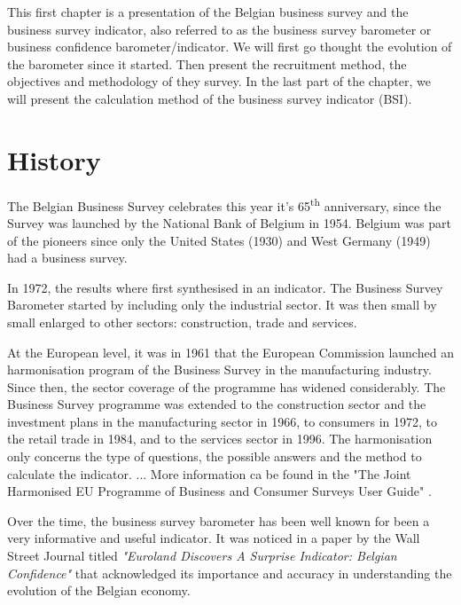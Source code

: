 \documentclass[12pt,a4paper,oneside]{book}
\begin{document}
This first chapter is a presentation of the Belgian business survey and the business survey indicator, also referred to as the business survey barometer or business confidence barometer/indicator.
We will first go thought the evolution of the barometer since it started. Then present the recruitment method, the objectives and methodology of they survey. 
In the last part of the chapter, we will present the calculation method of the business survey indicator (BSI).

\section{History}

The Belgian Business Survey celebrates this year it's 65\textsuperscript{th} anniversary, since the Survey was launched by the National Bank of Belgium in 1954. 
Belgium was part of the pioneers since only the United States (1930) and West Germany (1949) had a business survey.

In 1972, the results where first synthesised in an indicator.
The Business Survey Barometer started by including only the industrial sector. It was then small by small enlarged to other sectors: construction, trade and services. %

At the European level, it was in 1961 that the European Commission launched an harmonisation program of the Business Survey in the manufacturing industry. 
Since then, the sector coverage of the programme has widened considerably. The Business Survey programme was extended to the construction sector and the investment plans in the manufacturing sector in 1966, to consumers in 1972, to the retail trade in 1984, and to the services sector in 1996.
The harmonisation only concerns the type of questions, the possible answers and the method to calculate the indicator. ...
More information ca be found in the "The Joint Harmonised EU Programme of Business and Consumer Surveys User Guide" \cite{european_commission_joint_2016}.

Over the time, the business survey barometer has been well known for been a very informative and useful indicator. 
It was noticed in a paper by the Wall Street Journal titled \textit{"Euroland Discovers A Surprise Indicator: Belgian Confidence"} \citep{rhoads_euroland_1999} that acknowledged its importance and accuracy in understanding the evolution of the Belgian economy.

\end{document}
